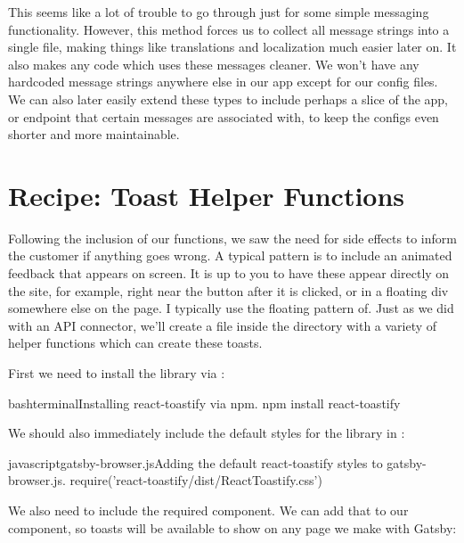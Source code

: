 \documentclass[a4paper,headinclude=on,footinclude=on,12pt,oneside]{scrbook}
\begin{document}

This seems like a lot of trouble to go through just for some simple messaging functionality. However, this method forces us to collect all message strings into a single file, making things like translations and localization much easier later on. It also makes any code which uses these messages cleaner. We won't have any hardcoded message strings anywhere else in our app except for our config files. We can also later easily extend these types to include perhaps a slice of the app, or endpoint that certain messages are associated with, to keep the configs even shorter and more maintainable.

\section{Recipe: Toast Helper Functions}

Following the inclusion of our  functions, we saw the need for side effects to inform the customer if anything goes wrong. A typical pattern is to include an animated feedback that appears on screen. It is up to you to have these appear directly on the site, for example, right near the button after it is clicked, or in a floating div somewhere else on the page. I typically use the floating pattern of. Just as we did with an API connector, we'll create a file  inside the  directory with a variety of helper functions which can create these toasts.


First we need to install the  library via :

\begin{codeInput}{bash}{terminal}{Installing react-toastify via npm.}
npm install react-toastify
\end{codeInput}

We should also immediately include the default styles for the library in :

\begin{codeInput}{javascript}{gatsby-browser.js}{Adding the default react-toastify styles to gatsby-browser.js.}
require('react-toastify/dist/ReactToastify.css')
\end{codeInput}

We also need to include the required  component. We can add that to our  component, so toasts will be available to show on any page we make with Gatsby:
\end{document}
